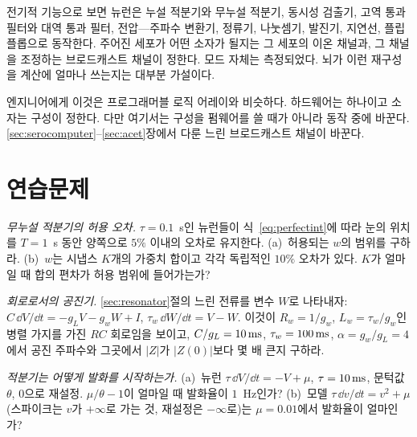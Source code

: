 \begin{keyblock}
\begin{proposition}[뉴런 하나, 여러 소자]
\label{prop:eetypes}
전기적 기능으로 보면 뉴런은 누설 적분기와 무누설 적분기, 동시성 검출기, 고역 통과 필터와 대역 통과 필터, 전압---주파수 변환기, 정류기, 나눗셈기, 발진기, 지연선, 플립플롭으로 동작한다. 주어진 세포가 어떤 소자가 될지는 그 세포의 이온 채널과, 그 채널을 조정하는 브로드캐스트 채널이 정한다. 모드 자체는 측정되었다. 뇌가 이런 재구성을 계산에 얼마나 쓰는지는 대부분 가설이다.
\end{proposition}
\end{keyblock}

엔지니어에게 이것은 프로그래머블 로직 어레이와 비슷하다. 하드웨어는 하나이고 소자는 구성이 정한다. 다만 여기서는 구성을 펌웨어를 쓸 때가 아니라 동작 중에 바꾼다. \ref{sec:serocomputer}--\ref{sec:acet}장에서 다룬 느린 브로드캐스트 채널이 바꾼다.

\section{연습문제}

\begin{exercise}[\lvlA]
\label{ex:18:1}
\emph{무누설 적분기의 허용 오차.} $\tau=0.1$~s인 뉴런들이 식~\eqref{eq:perfectint}에 따라 눈의 위치를 $T=1$~s 동안 양쪽으로 $5\%$ 이내의 오차로 유지한다. (a)~허용되는 $w$의 범위를 구하라. (b)~$w$는 시냅스 $K$개의 가중치 합이고 각각 독립적인 $10\%$ 오차가 있다. $K$가 얼마일 때 합의 편차가 허용 범위에 들어가는가?
\end{exercise}

\begin{exercise}[\lvlB]
\label{ex:18:2}
\emph{회로로서의 공진기.} \ref{sec:resonator}절의 느린 전류를 변수 $W$로 나타내자: $C\,\dd V/\dd t=-g_LV-g_wW+I$, $\tau_w\,\dd W/\dd t=V-W$. 이것이 $R_w=1/g_w$, $L_w=\tau_w/g_w$인 병렬 가지를 가진 $RC$ 회로임을 보이고, $C/g_L=10\,\text{ms}$, $\tau_w=100\,\text{ms}$, $\alpha=g_w/g_L=4$에서 공진 주파수와 그곳에서 $|Z|$가 $|Z(0)|$보다 몇 배 큰지 구하라.
\end{exercise}

\begin{exercise}[\lvlB]
\label{ex:18:3}
\emph{적분기는 어떻게 발화를 시작하는가.} (a)~뉴런 $\tau\,\dd V/\dd t=-V+\mu$, $\tau=10\,\text{ms}$, 문턱값 $\theta$, 0으로 재설정. $\mu/\theta-1$이 얼마일 때 발화율이 $1$~Hz인가? (b)~모델 $\tau\,\dd v/\dd t=v^2+\mu$(스파이크는 $v$가 $+\infty$로 가는 것, 재설정은 $-\infty$로)는 $\mu=0.01$에서 발화율이 얼마인가?
\end{exercise}

